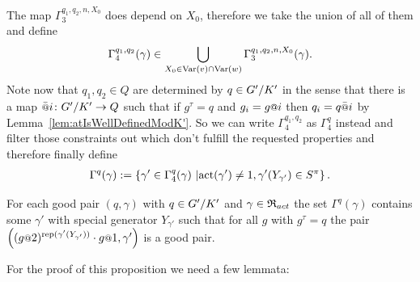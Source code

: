 \documentclass[a4paper,11pt]{amsart}
\begin{document}
 The map $\Gamma_3^{q_1,q_2,n,X_0}$ does depend on $X_0$, therefore we take the union of all of them and define
  \[\Gamma_4^{q_1,q_2}(\gamma)\in \bigcup_{X_0\in \textup{Var}(v)\cap\textup{Var}(w)}\Gamma_3^{q_1,q_2,n,X_0}(\gamma).\]
 Note now that $q_{1},q_2\in Q$ are determined by $q\in{G'/K'}$ in the sense that there is a map $\att{i}\colon \RNK{G'}{K'}\to Q$ such that if $g^\tau = q$ and $g_i=g\at{i}$ 
 then $q_i = q\att{i}$  by Lemma~\ref{lem:atIsWellDefinedModK'}. So we can write $\Gamma_4^{q_1,q_2}$ as $\Gamma_4^q$ instead and filter those 
 constraints out which don't fulfill the requested properties and therefore finally define
 \begin{align}
 \Gamma^q(\gamma) := \left\{\gamma' \in \Gamma_4^q(\gamma) \ \middle \vert 
  \operatorname{act}(\gamma')\neq 1, \gamma'({Y_{\gamma'}}) \in S^\pi \right\}. 
  \label{def:Gammaq}
 \end{align}
 \begin{pro}\label{pro:existsNextPair}
 For each good pair $(q,\gamma)$ with $q\in{G'/K'}$ and $\gamma\in\mathfrak{R}_{act}$ the set $\Gamma^q(\gamma)$ 
 contains some $\gamma'$ with special generator $Y_{\gamma'}$ such that for all $g$ with $g^\tau=q$ the
 pair $\left((g\at{2})^{\textup{rep}(\gamma'(Y_{\gamma'}))}\cdot g\at{1},\gamma'\right)$ is a good pair.
\end{pro}
For the proof of this proposition we need a few lemmata:
%  
\end{document}
